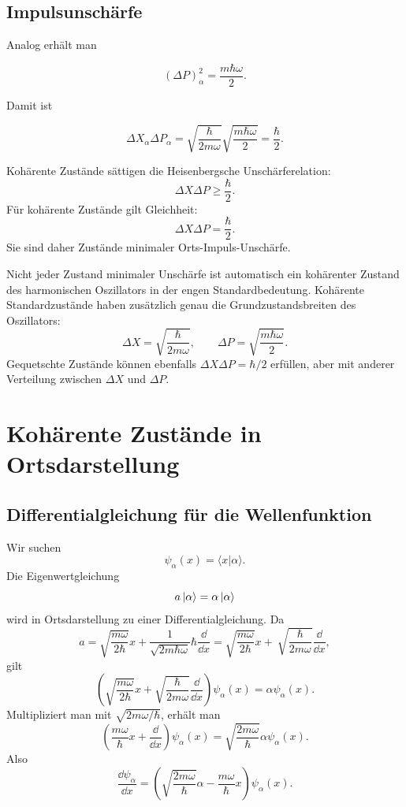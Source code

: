 \subsection{Impulsunschärfe}

Analog erhält man
\begin{formulabox}
\[
    (\Delta P)^2_\alpha
    =\frac{m\hbar\omega}{2}.
\]
\end{formulabox}

Damit ist
\begin{formulabox}
\[
    \Delta X_\alpha\Delta P_\alpha
    =\sqrt{\frac{\hbar}{2m\omega}}\sqrt{\frac{m\hbar\omega}{2}}
    =\frac{\hbar}{2}.
\]
\end{formulabox}

\begin{conceptbox}
Kohärente Zustände sättigen die Heisenbergsche Unschärferelation:
\[
    \Delta X\Delta P\geq \frac{\hbar}{2}.
\]
Für kohärente Zustände gilt Gleichheit:
\[
    \Delta X\Delta P=\frac{\hbar}{2}.
\]
Sie sind daher Zustände minimaler Orts-Impuls-Unschärfe.
\end{conceptbox}

\begin{notebox}
Nicht jeder Zustand minimaler Unschärfe ist automatisch ein kohärenter Zustand des harmonischen Oszillators in der engen Standardbedeutung. Kohärente Standardzustände haben zusätzlich genau die Grundzustandsbreiten des Oszillators:
\[
    \Delta X=\sqrt{\frac{\hbar}{2m\omega}},
    \qquad
    \Delta P=\sqrt{\frac{m\hbar\omega}{2}}.
\]
Gequetschte Zustände können ebenfalls \(\Delta X\Delta P=\hbar/2\) erfüllen, aber mit anderer Verteilung zwischen \(\Delta X\) und \(\Delta P\).
\end{notebox}

\section{Kohärente Zustände in Ortsdarstellung}

\subsection{Differentialgleichung für die Wellenfunktion}

Wir suchen
\[
    \psi_\alpha(x)=\langle x|\alpha\rangle.
\]
Die Eigenwertgleichung
\[
    a\left|\alpha\right\rangle=\alpha\left|\alpha\right\rangle
\]
wird in Ortsdarstellung zu einer Differentialgleichung. Da
\[
    a=\sqrt{\frac{m\omega}{2\hbar}}x+\frac{1}{\sqrt{2m\hbar\omega}}\hbar\frac{\dd}{\dd x}
    =\sqrt{\frac{m\omega}{2\hbar}}x+\
    \sqrt{\frac{\hbar}{2m\omega}}\frac{\dd}{\dd x},
\]
gilt
\[
    \left(\sqrt{\frac{m\omega}{2\hbar}}x+
    \sqrt{\frac{\hbar}{2m\omega}}\frac{\dd}{\dd x}\right)\psi_\alpha(x)
    =\alpha\psi_\alpha(x).
\]
Multipliziert man mit \(\sqrt{2m\omega/\hbar}\), erhält man
\[
    \left(\frac{m\omega}{\hbar}x+\frac{\dd}{\dd x}\right)\psi_\alpha(x)
    =\sqrt{\frac{2m\omega}{\hbar}}\alpha\psi_\alpha(x).
\]
Also
\[
    \frac{\dd \psi_\alpha}{\dd x}
    =\left(\sqrt{\frac{2m\omega}{\hbar}}\alpha-
    \frac{m\omega}{\hbar}x\right)\psi_\alpha(x).
\]

